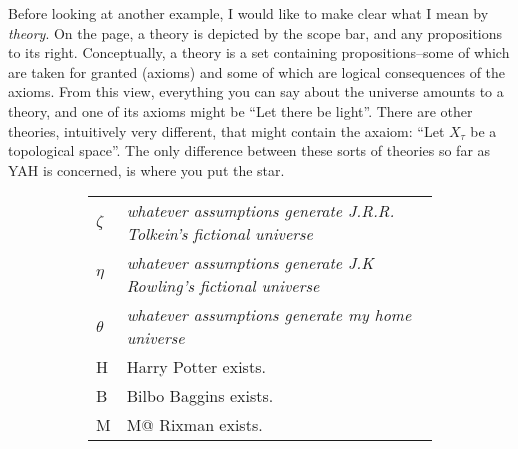 \documentclass[12pt]{article}
\begin{document}
\begin{flushleft}
Before looking at another example, I would like to make clear what I mean by \textit{theory}.
On the page, a theory is depicted by the scope bar, and any propositions to its right.
Conceptually, a theory is a set containing propositions--some of which are taken for granted (axioms) and some of which are logical consequences of the axioms.
From this view, everything you can say about the universe amounts to a theory, and one of its axioms might be ``Let there be light''.
There are other theories, intuitively very different, that might contain the axaiom: ``Let $X_\tau$ be a topological space''.
The only difference between these sorts of theories so far as YAH is concerned, is where you put the star.

\begin{figure}[h]
    \centering
    \begin{subfigure}{\linewidth}
        \centering
        \begin{tabular}{l|l}
            \hline
            $\zeta$ & \textit{whatever assumptions generate J.R.R. Tolkein's fictional universe}\\
            $\eta$ & \textit{whatever assumptions generate J.K Rowling's fictional universe}\\
            $\theta$ & \textit{whatever assumptions generate my home universe}\\
            H & Harry Potter exists.\\
            B & Bilbo Baggins exists.\\
            M & M@ Rixman exists.\\
            \hline
        \end{tabular}
    \end{subfigure}\\
    \par\bigskip
    \begin{subfigure}{.25\linewidth}
        \centering
        \fitchctx
        {
            \pline{\bigstar} \\
            \subproof
            {
                \pline{\mathnormal{\theta}}
            }
            {
                 \\
                \subproof
                {
                    \pline{\mathnormal{\eta}}
                }
                {
                }
            } \\
            \subproof
            {
                \pline{\mathnormal{\beta}}
            }
            {
}}
\end{subfigure}
\end{figure}
\end{flushleft}
\end{document}

